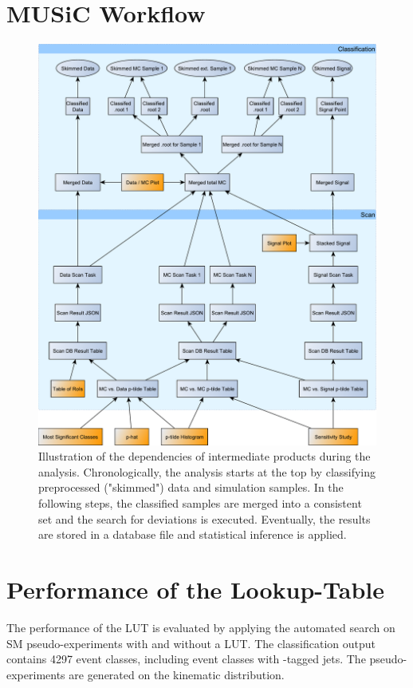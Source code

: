 \section{MUSiC Workflow}
\label{app:music_workflow}
\begin{figure}
    \centering
    \includegraphics[width=\textwidth]{../music-workflow}
    \caption{Illustration of the dependencies of intermediate products during the analysis. Chronologically, the analysis starts at the top by classifying preprocessed ("skimmed") data and simulation samples. In the following steps, the classified samples are merged into a consistent set and the search for deviations is executed. Eventually, the results are stored in a database file and statistical inference is applied.}
    \label{fig:music_workflow}
\end{figure}

\newpage
\section{Performance of the Lookup-Table}
\label{app:lut_performance}

The performance of the \acf{LUT} is evaluated by applying the automated search on \ac{SM} pseudo-experiments with and without a \ac{LUT}. The classification output contains \num{4297} event classes, including event classes with \Pqb-tagged jets. The pseudo-experiments are generated on the \sumpT kinematic distribution.

